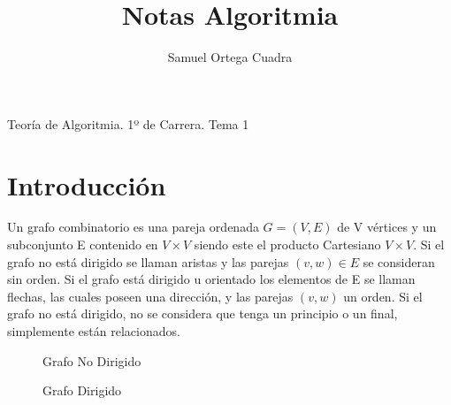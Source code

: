 \documentclass[11pt]{article}
\title{Notas Algoritmia}
\author{Samuel Ortega Cuadra}
\theoremstyle{plain}
\begin{document}
    \begin{center}
        \huge{Teoría de Algoritmia. 1º de Carrera. Tema 1}
    \end{center}
    \tableofcontents
    \newpage
    \section{Introducción} %
    \label{sec:introducción}
        Un grafo combinatorio es una pareja ordenada $G = (V,E)$ de V vértices y un subconjunto E contenido en $V \times V$ siendo este el producto Cartesiano $V \times V$. Si el grafo no está dirigido se llaman aristas y las parejas $(v,w) \in E$ se consideran sin orden. Si el grafo está dirigido u orientado los elementos de E se llaman flechas, las cuales poseen una dirección, y las parejas $(v,w)$ un orden. Si el grafo no está dirigido, no se considera que tenga un principio o un final, simplemente están relacionados.\\

        \begin{figure}[H]
            \centering
            \caption{Grafo No Dirigido} \label{Fig_1}
        \end{figure}
        \begin{figure}[H]
            \centering
            \caption{Grafo Dirigido} \label{Fig_2}
        \end{figure}
\end{document}
